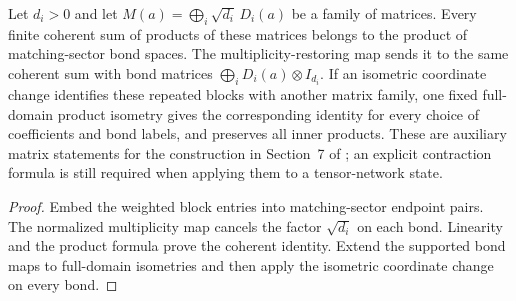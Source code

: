 \begin{lemma}
    \label{thm:peps_coherent_multiplicity_transport}
    \leanok
    Let $d_i>0$ and let $M(a)=\bigoplus_i\sqrt{d_i}\,D_i(a)$ be a
    family of matrices. Every finite coherent sum of products of these
    matrices belongs to the product of matching-sector bond spaces.
    The multiplicity-restoring map sends it to the same coherent sum
    with bond matrices $\bigoplus_i D_i(a)\otimes I_{d_i}$.
    If an isometric coordinate change identifies these repeated blocks
    with another matrix family, one fixed full-domain product isometry
    gives the corresponding identity for every choice of coefficients
    and bond labels, and preserves all inner products.
    These are auxiliary matrix statements for the construction in
    Section~7 of \cite{Schuch2010PEPS}; an explicit contraction formula is still
    required when applying them to a tensor-network state.
\end{lemma}
\begin{proof}\leanok
    Embed the weighted block entries into matching-sector endpoint pairs.
    The normalized multiplicity map cancels the factor $\sqrt{d_i}$ on
    each bond. Linearity and the product formula prove the coherent identity.
    Extend the supported bond maps to full-domain isometries and then apply
    the isometric coordinate change on every bond.
\end{proof}
